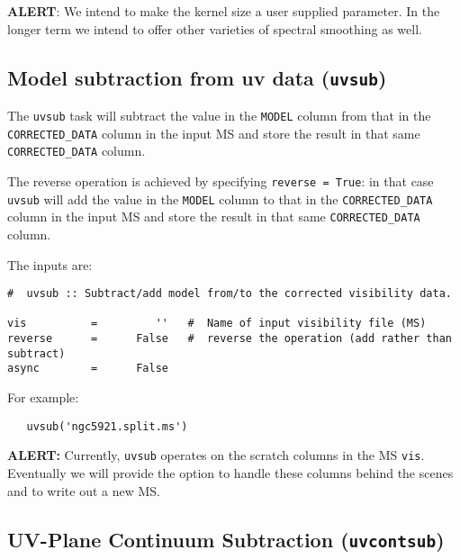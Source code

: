 {\bf ALERT}: We intend to make the kernel size a user supplied
parameter.  In the longer term we intend to offer other varieties of
spectral smoothing as well.

\subsection{Model subtraction from uv data ({\tt uvsub})}
\label{section:cal.other.uvsub}

The {\tt uvsub} task will subtract the value in the {\tt MODEL} column
from that in the {\tt CORRECTED\_DATA} column in the input MS and
store the result in that same {\tt CORRECTED\_DATA} column.

The reverse operation is achieved by specifying {\tt reverse = True}:
in that case {\tt uvsub} will add the value in the {\tt MODEL} column
to that in the {\tt CORRECTED\_DATA} column in the input MS and store
the result in that same {\tt CORRECTED\_DATA} column.

The inputs are:

\small
\begin{verbatim}
#  uvsub :: Subtract/add model from/to the corrected visibility data.

vis          =         ''   #  Name of input visibility file (MS)
reverse      =      False   #  reverse the operation (add rather than subtract)
async        =      False   
\end{verbatim}
\normalsize

For example:
\small
\begin{verbatim}
   uvsub('ngc5921.split.ms')
\end{verbatim}
\normalsize

{\bf ALERT:} Currently, {\tt uvsub} operates on the scratch
columns in the MS {\tt vis}.  Eventually we will provide the option to
handle these columns behind the scenes and to write out a new MS.

\subsection{UV-Plane Continuum Subtraction ({\tt uvcontsub})}
\label{section:cal.other.uvcontsub}

